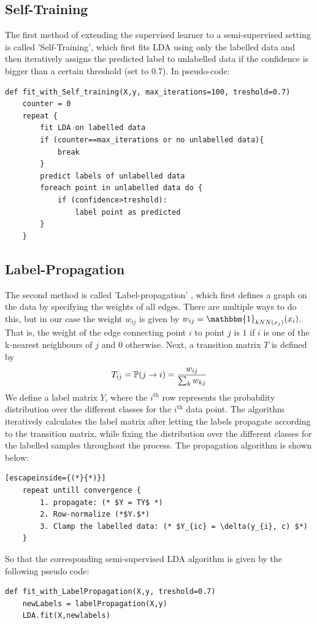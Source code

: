 \documentclass [a4paper] {report}
\begin{document}
	\subsection*{Self-Training}
	The first method of extending the supervised learner to a semi-supervised setting is called 'Self-Training', which first fits LDA using only the labelled data and then iteratively assigns the predicted label to unlabelled data if the confidence is bigger than a certain threshold (set to 0.7). In pseudo-code:
	
	\begin{lstlisting}
def fit_with_Self_training(X,y, max_iterations=100, treshold=0.7)
	counter = 0
	repeat {
		fit LDA on labelled data
		if (counter==max_iterations or no unlabelled data){
			break
		}
		predict labels of unlabelled data
		foreach point in unlabelled data do {
			if (confidence>treshold):
				label point as predicted
		}		
	}
	\end{lstlisting}
	\subsection*{Label-Propagation}
	The second method is called 'Label-propagation' \citep{propagation}, which first defines a graph on the data by specifying the weights of all edges. There are multiple ways to do this, but in our case the weight $w_{ij}$ is given by $w_{ij} = \mathbbm{1}_{kNN(x_{j})}(x_{i})$. That is, the weight of the edge connecting point $i$ to point $j$ is $1$ if $i$ is one of the k-nearest neighbours of $j$ and $0$ otherwise. Next, a transition matrix $T$ is defined by 
	$$T_{ij} = \mathbb{P}(j \to i) = {w_{ij} \over \sum_{k} w_{kj} } $$
	We define a label matrix $Y$, where the $i^{\text{th}}$ row represents the probability distribution over the different classes for the $i^{\text{th}}$ data point. The algorithm iteratively calculates the label matrix after letting the labels propagate according to the transition matrix, while fixing the distribution over the different classes for the labelled samples throughout the process. The propagation algorithm is shown below:
	\newpage
	\begin{lstlisting}[escapeinside={(*}{*)}]
	repeat untill convergence {
		1. propagate: (* $Y = TY$ *)
		2. Row-normalize (*$Y.$*)
		3. Clamp the labelled data: (* $Y_{ic} = \delta(y_{i}, c) $*)	
	}
	\end{lstlisting}
	So that the corresponding semi-supervised LDA algorithm is given by the following pseudo code:
	\begin{lstlisting}
def fit_with_LabelPropagation(X,y, treshold=0.7)
	newLabels = labelPropagation(X,y)
	LDA.fit(X,newlabels)
	\end{lstlisting}
	
\end{document}
